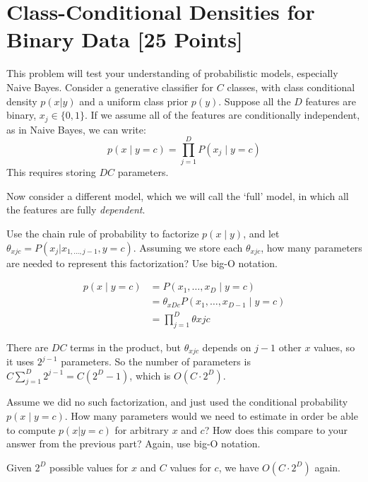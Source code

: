 \section{Class-Conditional Densities for Binary Data [25 Points]}
This problem will test your understanding of probabilistic models, especially Naive Bayes.
Consider a generative classifier for $C$ classes, with class conditional density $p(x | y)$ and a uniform class prior $p(y)$. Suppose all the $D$ features are binary, $x_j \in \{0, 1 \}$. If we assume all of the features are conditionally independent, as in Naive Bayes, we can write:
$$p(x \mid y = c) = \prod_{j=1}^D P(x_j \mid y = c) $$
This requires storing $DC$ parameters. 

Now consider a different model, which we will call the `full' model, in which all the features are fully \textit{dependent}.

\problem[5]Use the chain rule of probability to factorize $p(x \mid y)$, and let $\theta_{xjc} = P(x_j | x_{1, \ldots, j - 1}, y = c)$. Assuming we store each $\theta_{xjc}$, how many parameters are needed to represent this factorization? Use big-O notation.

\begin{solution} %
  \begin{align*}
    p(x \mid y = c) &= P(x_1, \dots, x_D \mid y = c) \\
      &= \theta_{xDc} P(x_1, \dots, x_{D-1} \mid y = c) \\
      &= \prod_{j=1}^D \theta{xjc}
  \end{align*}

  There are $DC$ terms in the product, but $\theta_{xjc}$ depends on $j - 1$ other $x$ values, so it uses $2^{j-1}$ parameters.
  So the number of parameters is $C \sum_{j=1}^D 2^{j-1} = C (2^D - 1)$, which is $O(C \cdot 2^D)$.
\end{solution}

\problem[5] Assume we did no such factorization, and just used the conditional probability $p(x \mid y = c)$. How many parameters would we need to estimate in order be able to compute $p(x | y = c)$ for arbitrary $x$ and $c$? How does this compare to your answer from the previous part? Again, use big-O notation.

\begin{solution}
  Given $2^D$ possible values for $x$ and $C$ values for $c$, we have $O(C \cdot 2^D)$ again.
\end{solution}

